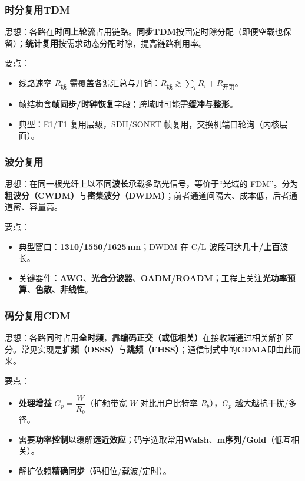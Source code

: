 \documentclass[lang=cn,newtx,10pt,scheme=chinese]{../../elegantbook}
\begin{document}
\subsubsection{时分复用TDM}
思想：各路在\textbf{时间上轮流}占用链路。\textbf{同步TDM}按固定时隙分配（即便空载也保留）；\textbf{统计复用}按需求动态分配时隙，提高链路利用率。

要点：
\begin{itemize}
    \item 线路速率 $R_\text{线}$ 需覆盖各源汇总与开销：$R_\text{线}\gtrsim \sum_i R_i + R_\text{开销}$。
    \item 帧结构含\textbf{帧同步/时钟恢复}字段；跨域时可能需\textbf{缓冲与整形}。
    \item 典型：E1/T1 复用层级，SDH/SONET 帧复用，交换机端口轮询（内核层面）。
\end{itemize}

\subsubsection{波分复用}
思想：在同一根光纤上以不同\textbf{波长}承载多路光信号，等价于“光域的 FDM”。分为\textbf{粗波分（CWDM）}与\textbf{密集波分（DWDM）}；前者通道间隔大、成本低，后者通道密、容量高。

要点：
\begin{itemize}
    \item 典型窗口：\textbf{1310/1550/1625\,nm}；DWDM 在 C/L 波段可达\textbf{几十/上百}波长。
    \item 关键器件：\textbf{AWG}、\textbf{光合分波器}、\textbf{OADM/ROADM}；工程上关注\textbf{光功率预算、色散、非线性}。
\end{itemize}

\subsubsection{码分复用CDM}
思想：各路同时占用\textbf{全时频}，靠\textbf{编码正交（或低相关）}在接收端通过相关解扩区分。常见实现是\textbf{扩频（DSSS）}与\textbf{跳频（FHSS）}；通信制式中的\textbf{CDMA}即由此而来。

要点：
\begin{itemize}
    \item \textbf{处理增益} $G_p=\dfrac{W}{R_b}$（扩频带宽 $W$ 对比用户比特率 $R_b$），$G_p$ 越大越抗干扰/多径。
    \item 需要\textbf{功率控制}以缓解\textbf{远近效应}；码字选取常用\textbf{Walsh}、\textbf{m序列/Gold}（低互相关）。
    \item 解扩依赖\textbf{精确同步}（码相位/载波/定时）。
\end{itemize}
\end{document}
